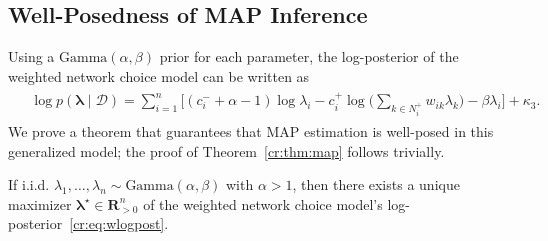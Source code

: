 \subsection{Well-Posedness of MAP Inference}

Using a $\text{Gamma}(\alpha, \beta)$ prior for each parameter, the log-posterior of the weighted network choice model can be written as
\begin{align}
\label{cr:eq:wlogpost}
\begin{aligned}
&\log p(\bm{\lambda} \mid \mathcal{D}) =
    \sum_{i = 1}^n \bigg[ (c^-_i + \alpha - 1) \log \lambda_i
        - c^+_i \log \bigg( \sum_{k \in N^+_i} w_{ik} \lambda_k \bigg)  - \beta \lambda_i \bigg]
    + \kappa_3.
\end{aligned}
\end{align}
We prove a theorem that guarantees that MAP estimation is well-posed in this generalized model; the proof of Theorem~\ref{cr:thm:map} follows trivially.

\begin{theorem}
\label{cr:thm:wmap}
If i.i.d. $\lambda_1, \ldots, \lambda_n \sim \text{Gamma}(\alpha, \beta)$ with $\alpha > 1$, then there exists a unique maximizer $\bm{\lambda}^\star \in \mathbf{R}^n_{>0}$ of the weighted network choice model's log-posterior~\eqref{cr:eq:wlogpost}.
\end{theorem}

